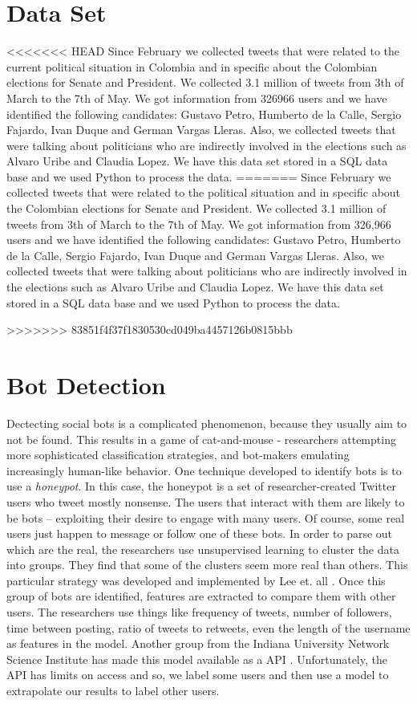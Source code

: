 \documentclass[10pt,a4paper]{article} %
\begin{document}
	\section{Data Set}
<<<<<<< HEAD
	Since February we collected tweets that were related to the current political situation in Colombia and in specific about the Colombian elections for Senate and President. We collected 3.1 million of tweets from 3th of March to the 7th of May. We got information from 326966 users and we have identified the following candidates: Gustavo Petro, Humberto de la Calle, Sergio Fajardo, Ivan Duque and German Vargas Lleras. Also, we collected tweets that were talking about politicians who are indirectly involved in the elections such as Alvaro Uribe and Claudia Lopez. We have this data set stored in a SQL data base and we used Python to process the data.
=======
	Since February we collected tweets that were related to the political situation and in specific about the Colombian elections for Senate and President. We collected 3.1 million of tweets from 3th of March to the 7th of May. We got information from 326,966 users and we have identified the following candidates: Gustavo Petro, Humberto de la Calle, Sergio Fajardo, Ivan Duque and German Vargas Lleras. Also, we collected tweets that were talking about politicians who are indirectly involved in the elections such as Alvaro Uribe and Claudia Lopez. We have this data set stored in a SQL data base and we used Python to process the data.
	\pagebreak
	
>>>>>>> 83851f4f37f1830530cd049ba4457126b0815bbb
	\section{Bot Detection} 
		Dectecting social bots is a complicated phenomenon, because they usually aim to not be found.  This results in a game of cat-and-mouse - researchers attempting more sophisticated classification strategies, and bot-makers emulating increasingly human-like behavior.  One technique developed to identify bots is to use a \textit{honeypot}.  In this case, the honeypot is a set of researcher-created Twitter users who tweet mostly nonsense.  The users that interact with them are likely to be bots -- exploiting their desire to engage with many users.  Of course, some real users just happen to message or follow one of these bots.  In order to parse out which are the real, the researchers use unsupervised learning to cluster the data into groups.  They find that some of the clusters seem more real than others.  This particular strategy was developed and implemented by Lee et. all \cite{}.  Once this group of bots are identified, features are extracted to compare them with other users.  The researchers use things like frequency of tweets, number of followers, time between posting, ratio of tweets to retweets, even the length of the username as features in the model.  Another group from the Indiana University Network Science Institute has made this model available as a API \cite{DavisVFFM16}.  Unfortunately, the API has limits on access and so, we label some users and then use a model to extrapolate our results to label other users. \\
		
\end{document}
